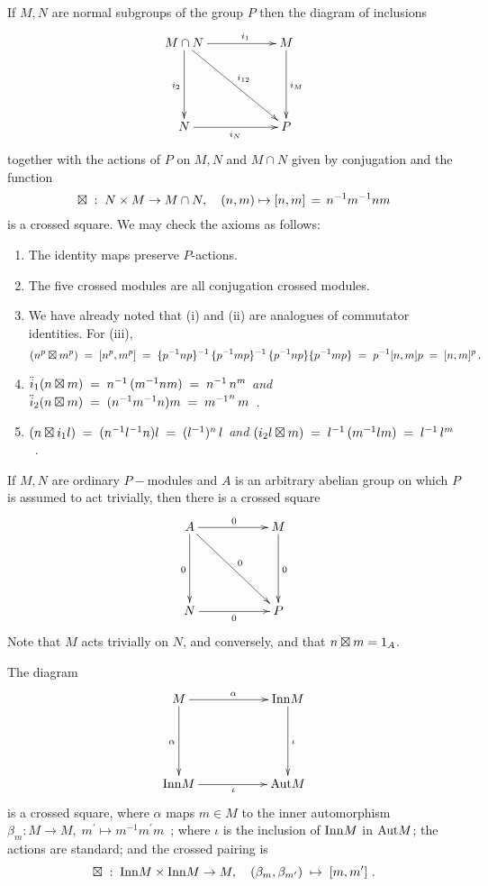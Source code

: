 \begin{example}
If $M, N$ are normal subgroups of the group $P$ 
then the diagram of inclusions 
$$
\xymatrix{
M \cap N \ar[rr]^(0.6){i_1} \ar[dd]_{i_2} \ar[rrdd]^{i_{12}} 
  && M \ar[dd]^{i_M} \\
       \\
N \ar[rr]_{i_N}  
  && P 
}
$$
together with the actions of $P$ on $M, N$ 
and $M \cap N$ given by conjugation and the function 
$$
\boxtimes \;:\; N \times M \to M \cap N, \quad (n,m) \mapsto [n,m]\,=\,n^{-1}m^{-1}nm
$$
is a crossed square.
We may check the axioms as follows: 
\begin{enumerate}[{\rm (a)}]
\item
The identity maps preserve $P$-actions.
\item
The five crossed modules are all conjugation crossed modules.
\item 
We have already noted that (i) and (ii) are analogues of commutator identities. 
For (iii), 
$$
(n^p \boxtimes m^p) \;=\; [n^p,m^p]
  \;=\;  \{p^{-1}np\}^{-1}\,\{p^{-1}mp\}^{-1}\,\{p^{-1}np\}\{p^{-1}mp\}  \\
  \;=\;  p^{-1}[n,m]p \;=\; [n,m]^p\,.
$$
\item\quad
$\ddot{i}_1 (n \boxtimes m) \;=\; n^{-1}\,(m^{-1}nm) \;=\; n^{-1}\,n^m$
\quad \emph{and} \quad
$\ddot{i}_2 (n \boxtimes m) \;=\; (n^{-1}m^{-1}n)m \;=\; {m^{-1}}^n\,m$~.
\item\quad
$(n \boxtimes i_1 l) \;=\; (n^{-1}l^{-1}n)l \;=\; (l^{-1})^n\,l$
\quad \emph{and} \quad
$(i_2 l \boxtimes m) \;=\; l^{-1}\,(m^{-1}lm) \;=\; l^{-1}\,l^m$~.
\end{enumerate}
\end{example}

\begin{example}
If $M, N$ are ordinary $P-$modules and $A$ is an arbitrary abelian group
on which $P$ is assumed to act trivially, 
then there is a crossed square 
$$
\xymatrix{
A \ar[rr]^{0} \ar[dd]_{0} \ar[rrdd]^{0}  
  && M \ar[dd]^{0} \\
  &&               \\
N \ar[rr]_{0} 
  && P 
}
$$
Note that $M$ acts trivially on $N$, and conversely, 
and that $n \boxtimes m = 1_A$. 
\end{example}

\begin{example}
The diagram 
$$
\xymatrix{
M \ar[rr]^{\alpha} \ar[dd]_{\alpha}  && \Inn M \ar[dd]^{\iota} \\
       \\
\Inn M \ar[rr]_{\iota}  && \Aut M 
}
$$
is a crossed square, where $\alpha$ maps $m \in M$
to the inner automorphism  $\beta_m : M \to M,\; 
m^{\prime} \mapsto m^{-1}m^{\prime}m$~; 
where $\iota$ is the inclusion of $\mathrm{Inn} M$  in  $\mathrm{Aut} M$;
the actions are standard; and the crossed pairing is 
$$
\boxtimes \;:\; \mathrm{Inn} M \times \mathrm{Inn} M \to M, \quad
(\beta_m, \beta_{m^{\prime}}) \;\mapsto\; [m, m^{\prime}]~.
$$
\end{example}

